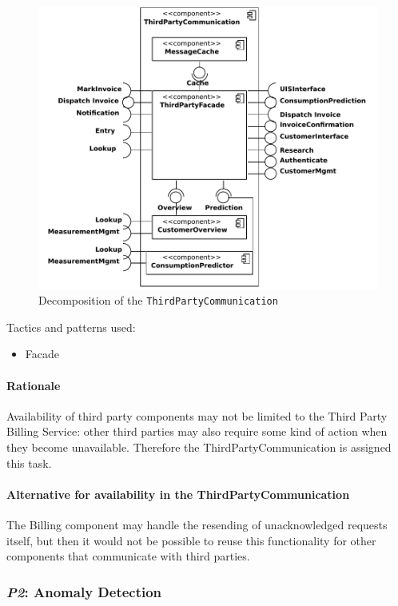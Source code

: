 \documentclass[a4paper,10pt]{article}
\begin{document}
\begin{figure}[!htp]
    \centering
    \includegraphics[width=\textwidth]{Decomposition__Communication_with_third_parties}
    \caption{Decomposition of the \texttt{ThirdPartyCommunication}}\label{fig:dec_thirdparty}
\end{figure}

\noindent Tactics and patterns used:
\begin{itemize}
	\item Facade
\end{itemize}

\paragraph{Rationale} Availability of third party components may not be limited to the Third Party Billing Service: other third parties may also require some kind of action when they become unavailable. Therefore the ThirdPartyCommunication is assigned this task.

\paragraph{Alternative for availability in the ThirdPartyCommunication}
The Billing component may handle the resending of unacknowledged requests itself, but then it would not be possible to reuse this functionality for other components that communicate with third parties.

\subsubsection{\emph{P2}: Anomaly Detection}
\end{document}
